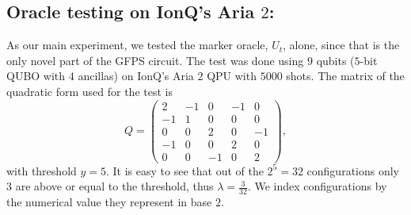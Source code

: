 \documentclass[reqno,10pt]{amsart}
\numberwithin{equation}{section}                %
\begin{document}
\subsection{Oracle testing on IonQ's Aria $2$:} As our main experiment, we tested the marker oracle, $U_t$, alone, since that is the only novel part of the GFPS circuit. The test was done using $9$ qubits ($5$-bit QUBO with $4$ ancillas) on IonQ's Aria $2$ QPU with $5000$ shots. The matrix of the quadratic form used for the test is
\begin{equation}
   Q = \begin{pmatrix}
         2 & - 1 & 0 & - 1 & 0 \\
         - 1 & 1 & 0 & 0 & 0 \\
         0 & 0 & 2 & 0 & - 1 \\
         - 1 & 0 & 0 & 2 & 0 \\
         0 & 0 & - 1 & 0 & 2
      \end{pmatrix},
\end{equation}
with threshold $y = 5$. It is easy to see that out of the $2^5 = 32$ configurations only $3$ are above or equal to the threshold, thus $\lambda = \tfrac{3}{32}$. We index configurations by the numerical value they represent in base $2$.
\end{document}
